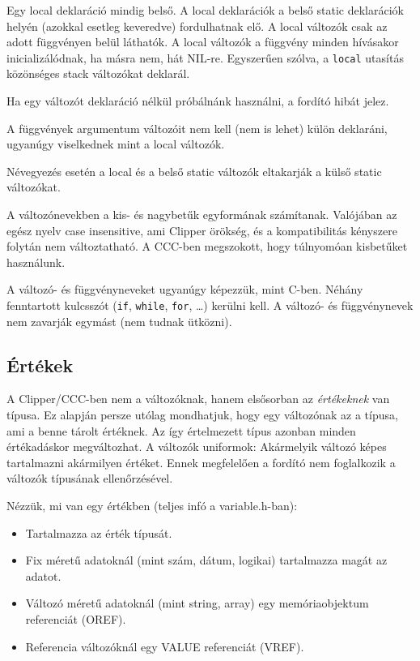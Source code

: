 Egy local deklaráció mindig belső. 
A local deklarációk a belső static deklarációk helyén 
(azokkal esetleg keveredve) fordulhatnak elő. 
A local változók csak az adott függvényen belül láthatók. 
A local változók a függvény minden hívásakor inicializálódnak, ha másra nem, hát NIL-re.
Egyszerűen szólva, a \verb!local! utasítás közönséges stack változókat deklarál.

Ha egy változót deklaráció nélkül próbálnánk használni, 
a fordító hibát jelez.

A függvények argumentum változóit nem kell (nem is lehet) külön deklaráni, 
ugyanúgy viselkednek mint a local változók.

Névegyezés esetén a local és a belső static változók eltakarják
a külső static változókat.

A változónevekben a kis- és nagybetűk egyformának számítanak.
Valójában az egész nyelv case insensitive, ami Clipper örökség,
és a kompatibilitás kényszere folytán nem változtatható.
A CCC-ben  megszokott, hogy túlnyomóan kisbetűket használunk.

A változó- és függvényneveket ugyanúgy képezzük, mint C-ben.
Néhány fenntartott kulcsszót 
(\verb!if!, \verb!while!, \verb!for!, \ldots) 
kerülni kell.
A változó- és függvénynevek nem zavarják egymást (nem tudnak ütközni).





\subsection{Értékek}


A Clipper/CCC-ben nem a változóknak, hanem elsősorban az {\em értékeknek\/} 
van típusa. Ez alapján persze utólag mondhatjuk, hogy egy változónak az a típusa, 
ami a benne tárolt értéknek. Az így értelmezett típus azonban minden
értékadáskor megváltozhat. A változók uniformok: Akármelyik változó képes tartalmazni 
akármilyen értéket. Ennek megfelelően a fordító nem foglalkozik a változók 
típusának ellenőrzésével. 

Nézzük, mi van egy értékben
(teljes infó a variable.h-ban):

\begin{itemize}
\item Tartalmazza az érték típusát.
\item Fix méretű adatoknál (mint szám, dátum, logikai) 
      tartalmazza magát az adatot.
\item Változó méretű adatoknál (mint string, array)
      egy memóriaobjektum referenciát (OREF).
\item Referencia változóknál egy VALUE referenciát (VREF).
\end{itemize}


